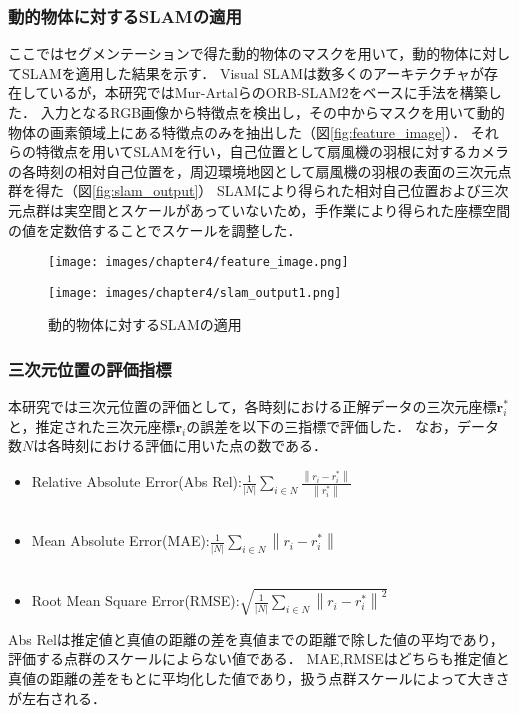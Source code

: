 \subsubsection*{動的物体に対するSLAMの適用}
ここではセグメンテーションで得た動的物体のマスクを用いて，動的物体に対してSLAMを適用した結果を示す．
Visual SLAMは数多くのアーキテクチャが存在しているが，本研究ではMur-Artalら\cite{mur2017orb}のORB-SLAM2をベースに手法を構築した．
入力となるRGB画像から特徴点を検出し，その中からマスクを用いて動的物体の画素領域上にある特徴点のみを抽出した（図\ref{fig:feature_image}）．
それらの特徴点を用いてSLAMを行い，自己位置として扇風機の羽根に対するカメラの各時刻の相対自己位置を，周辺環境地図として扇風機の羽根の表面の三次元点群を得た（図\ref{fig:slam_output}）
SLAMにより得られた相対自己位置および三次元点群は実空間とスケールがあっていないため，手作業により得られた座標空間の値を定数倍することでスケールを調整した．
\begin{figure}[h]
	\centering
	\begin{minipage}[b]{0.45\hsize}
		\centering
		\texttt{[image: images/chapter4/feature\_image.png]}
		\label{fig:feature_image}
	\end{minipage}
	\begin{minipage}[b]{0.45\hsize}
		\centering
		\texttt{[image: images/chapter4/slam\_output1.png]}
		\label{fig:slam_output}
	\end{minipage}
	\caption[動的物体に対するSLAMの適用]{動的物体に対するSLAMの適用}
	\label{fig:apply_SLAM}
\end{figure}
\subsubsection*{三次元位置の評価指標}
本研究では三次元位置の評価として，各時刻における正解データの三次元座標$\mathbf{r}^{*}_{i}$と，推定された三次元座標$\mathbf{r}_i$の誤差を以下の三指標で評価した．
なお，データ数$N$は各時刻における評価に用いた点の数である．
\begin{itemize}
	\item Relative Absolute Error(Abs Rel):$\displaystyle \frac{1}{|N|} \sum_{i \in N} \frac{\left\|r_i-r_i^*\right\|}{\left\|r_i^*\right\|}$
	\\
	\\
	\item Mean Absolute Error(MAE):$\displaystyle \frac{1}{|{N}|} \sum_{{i} \in {N}}\left\|r_{{i}}-r_i^*\right\|$
	\\
	\\
	\item Root Mean Square Error(RMSE):$\displaystyle \sqrt{\frac{1}{|{N}|} \sum_{{i} \in {N}}\left\|r_{{i}}-r_i^*\right\|^2}$
	
\end{itemize}
Abs Relは推定値と真値の距離の差を真値までの距離で除した値の平均であり，評価する点群のスケールによらない値である．
MAE,RMSEはどちらも推定値と真値の距離の差をもとに平均化した値であり，扱う点群スケールによって大きさが左右される．

